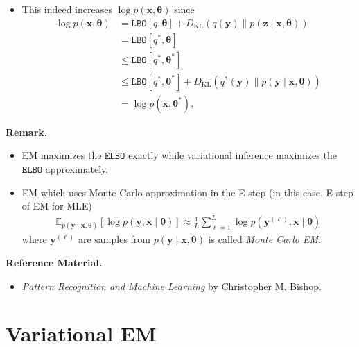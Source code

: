 \documentclass[10pt]{article}
\newcommand{\EE}{\mathbb{E}}
\newcommand{\lbo}{\texttt{LBO}}
\newcommand{\elbo}{\texttt{ELBO}}
\newcommand{\KL}{D_{\text{KL}}}
\begin{document}
\begin{itemize}
\begin{itemize}
\end{itemize}
\item This indeed increases $\log p(\bm{x}, \bm{\theta})$ since
\begin{align*}
\log p(\bm{x}, \bm{\theta}) &= \lbo[q,\bm{\theta}] + \KL(q(\bm{y}) \| p(\bm{z} \mid \bm{x}, \bm{\theta})) \\
&= \lbo[q^*,\bm{\theta}] \\
&\leq \lbo[q^*,\bm{\theta}^*] \\
&\leq \lbo[q^*,\bm{\theta}^*] + \KL(q^*(\bm{y}) \| p(\bm{y} \mid \bm{x}, \bm{\theta})) \\
&= \log p(\bm{x}, \bm{\theta}^*).
\end{align*}
\end{itemize}

\textbf{Remark.}
\begin{itemize}
\item EM maximizes the $\elbo$ exactly while variational inference maximizes the $\elbo$ approximately.
\item EM which uses Monte Carlo approximation in the E step (in this case, E step of EM for MLE)
\begin{align*}
\EE_{p(\bm{y} \mid \bm{x},\bm{\theta})} [ \log p(\bm{y},\bm{x} \mid \bm{\theta}) ] \approx \frac{1}{L} \sum_{\ell = 1}^L \log p(\bm{y}^{(\ell)},\bm{x} \mid \bm{\theta})
\end{align*}
where $\bm{y}^{(\ell)}$ are samples from $p(\bm{y} \mid \bm{x},\bm{\theta})$ is called \textit{Monte Carlo EM}.
\end{itemize}

\textbf{Reference Material.}
\begin{itemize}
\item \textit{Pattern Recognition and Machine Learning} by Christopher M. Bishop.
\end{itemize}

\newpage

\section{Variational EM}
\end{document}
